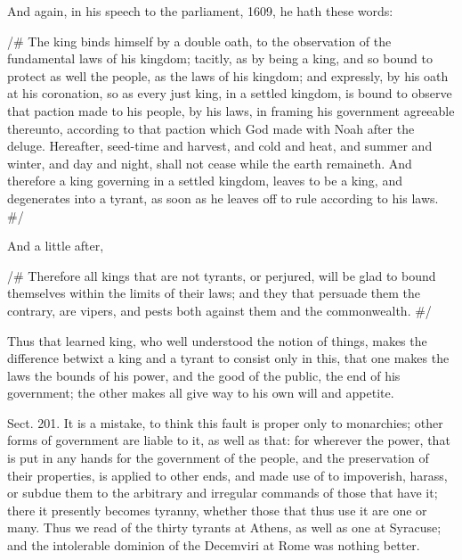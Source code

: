 \documentclass[11pt,openany]{book}
\begin{document}
And again, in his speech to the parliament, 1609, he hath these words:

/\# The king binds himself by a double oath, to the observation of the fundamental laws of his kingdom; tacitly, as by being a king, and so bound to protect as well the people, as the laws of his kingdom; and expressly, by his oath at his coronation, so as every just king, in a settled kingdom, is bound to observe that paction made to his people, by his laws, in framing his government agreeable thereunto, according to that paction which God made with Noah after the deluge. Hereafter, seed-time and harvest, and cold and heat, and summer and winter, and day and night, shall not cease while the earth remaineth. And therefore a king governing in a settled kingdom, leaves to be a king, and degenerates into a tyrant, as soon as he leaves off to rule according to his laws. \#/

And a little after,

/\# Therefore all kings that are not tyrants, or perjured, will be glad to bound themselves within the limits of their laws; and they that persuade them the contrary, are vipers, and pests both against them and the commonwealth. \#/

Thus that learned king, who well understood the notion of things, makes the difference betwixt a king and a tyrant to consist only in this, that one makes the laws the bounds of his power, and the good of the public, the end of his government; the other makes all give way to his own will and appetite.

Sect. 201. It is a mistake, to think this fault is proper only to monarchies; other forms of government are liable to it, as well as that: for wherever the power, that is put in any hands for the government of the people, and the preservation of their properties, is applied to other ends, and made use of to impoverish, harass, or subdue them to the arbitrary and irregular commands of those that have it; there it presently becomes tyranny, whether those that thus use it are one or many. Thus we read of the thirty tyrants at Athens, as well as one at Syracuse; and the intolerable dominion of the Decemviri at Rome was nothing better.
\end{document}

